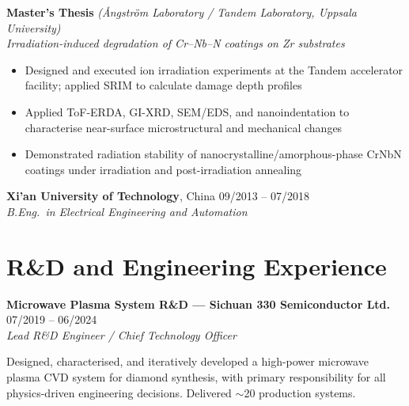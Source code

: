 \documentclass[a4paper,11pt]{article}
\begin{document}
\medskip
\noindent\textbf{Master's Thesis} \textit{(Ångström Laboratory / Tandem Laboratory,
Uppsala University)} \\
\textit{Irradiation-induced degradation of Cr--Nb--N coatings on Zr substrates}
\begin{itemize}[noitemsep, topsep=2pt, leftmargin=*]
    \item Designed and executed ion irradiation experiments at the Tandem
          accelerator facility; applied SRIM to calculate damage depth profiles
    \item Applied ToF-ERDA, GI-XRD, SEM/EDS, and nanoindentation to characterise
          near-surface microstructural and mechanical changes
    \item Demonstrated radiation stability of nanocrystalline/amorphous-phase
          CrNbN coatings under irradiation and post-irradiation annealing
\end{itemize}

\medskip
\noindent\textbf{Xi'an University of Technology}, China \hfill 09/2013 -- 07/2018 \\
\textit{B.Eng.\ in Electrical Engineering and Automation}

\section*{R\&D and Engineering Experience}

\noindent\textbf{Microwave Plasma System R\&D --- Sichuan 330 Semiconductor Ltd.}
\hfill 07/2019 -- 06/2024 \\
\textit{Lead R\&D Engineer / Chief Technology Officer}

\noindent Designed, characterised, and iteratively developed a high-power
microwave plasma CVD system for diamond synthesis, with primary responsibility
for all physics-driven engineering decisions. Delivered $\sim$20 production systems.
\end{document}
